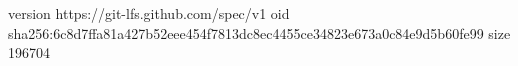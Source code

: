 version https://git-lfs.github.com/spec/v1
oid sha256:6c8d7ffa81a427b52eee454f7813dc8ec4455ce34823e673a0c84e9d5b60fe99
size 196704
